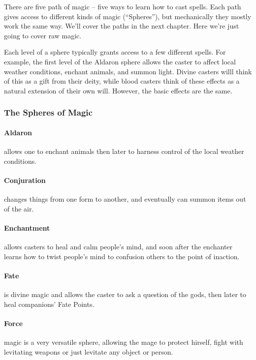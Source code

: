\documentclass[titlepage,a4paper,openany]{book}
\begin{document}
\begin{multicols}{2}

There are five path of magic -- five ways to learn how to cast spells.  Each path gives access to different kinds of magic (``Spheres''), but mechanically they mostly work the same way.
We'll cover the paths in the next chapter.  Here we're just going to cover raw magic.

Each level of a sphere typically grants access to a few different spells.  For example, the first level of the Aldaron sphere allows the caster to affect local weather conditions, enchant animals, and summon light.  Divine casters willl think of this as a gift from their deity, while blood casters think of these effects as a natural extension of their own will.  However, the basic effects are the same.

\subsubsection{The Spheres of Magic}

\paragraph{Aldaron}allows one to enchant animals then later to harness control of the local weather conditions.

\paragraph{Conjuration} changes things from one form to another, and eventually can summon items out of the air.

\paragraph{Enchantment} allows casters to heal and calm people's mind, and soon after the enchanter learns how to twist people's mind to confusion others to the point of inaction.

\paragraph{Fate} is divine magic and allows the caster to ask a question of the gods, then later to heal companions' Fate Points.

\paragraph{Force} magic is a very versatile sphere, allowing the mage to protect hirself, fight with levitating weapons or just levitate any object or person.


\end{multicols}
\end{document}
